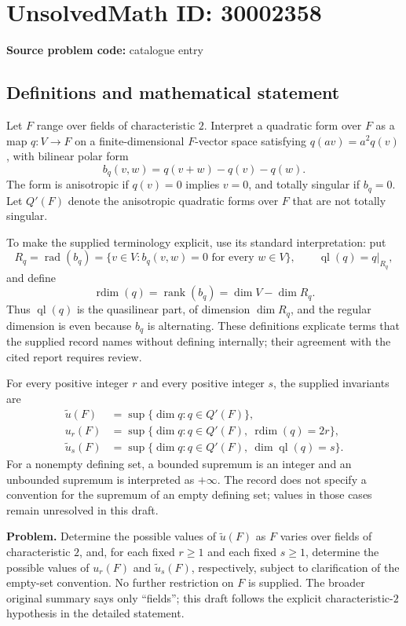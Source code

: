 \documentclass[11pt]{article}
\begin{document}
\section*{UnsolvedMath ID: 30002358}
\textbf{Source problem code:} catalogue entry
\subsection{Definitions and mathematical statement}
Let \(F\) range over fields of characteristic \(2\). Interpret a quadratic form over \(F\) as a map \(q\colon V\to F\) on a finite-dimensional \(F\)-vector space satisfying \(q(av)=a^2q(v)\), with bilinear polar form
\[
b_q(v,w)=q(v+w)-q(v)-q(w).
\]
The form is anisotropic if \(q(v)=0\) implies \(v=0\), and totally singular if \(b_q=0\). Let \(Q'(F)\) denote the anisotropic quadratic forms over \(F\) that are not totally singular.

To make the supplied terminology explicit, use its standard interpretation: put
\[
R_q=\operatorname{rad}(b_q)=\{v\in V:b_q(v,w)=0\text{ for every }w\in V\},
\qquad
\operatorname{ql}(q)=q|_{R_q},
\]
and define
\[
\operatorname{rdim}(q)=\operatorname{rank}(b_q)=\dim V-\dim R_q.
\]
Thus \(\operatorname{ql}(q)\) is the quasilinear part, of dimension \(\dim R_q\), and the regular dimension is even because \(b_q\) is alternating. These definitions explicate terms that the supplied record names without defining internally; their agreement with the cited report requires review.

For every positive integer \(r\) and every positive integer \(s\), the supplied invariants are
\[
\begin{aligned}
\widetilde u(F)&=\sup\{\dim q:q\in Q'(F)\},\\
u_r(F)&=\sup\{\dim q:q\in Q'(F),\ \operatorname{rdim}(q)=2r\},\\
\widetilde u_s(F)&=\sup\{\dim q:q\in Q'(F),\ \dim\operatorname{ql}(q)=s\}.
\end{aligned}
\]
For a nonempty defining set, a bounded supremum is an integer and an unbounded supremum is interpreted as \(+\infty\). The record does not specify a convention for the supremum of an empty defining set; values in those cases remain unresolved in this draft.

\textbf{Problem.} Determine the possible values of \(\widetilde u(F)\) as \(F\) varies over fields of characteristic \(2\), and, for each fixed \(r\geq1\) and each fixed \(s\geq1\), determine the possible values of \(u_r(F)\) and \(\widetilde u_s(F)\), respectively, subject to clarification of the empty-set convention. No further restriction on \(F\) is supplied. The broader original summary says only ``fields''; this draft follows the explicit characteristic-\(2\) hypothesis in the detailed statement.
\end{document}

